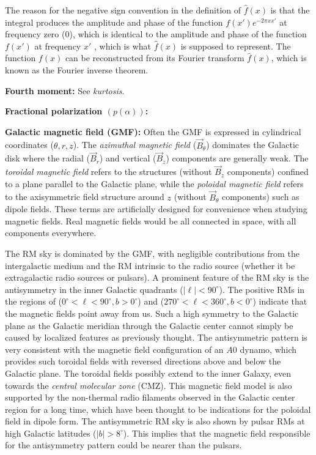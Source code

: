 \documentclass[a4paper,10pt]{article}
\begin{document}
{\noindent}The reason for the negative sign convention in the definition of $\hat{f}(x)$ is that the integral produces the amplitude and phase of the function $f(x')e^{-2\pi xx'}$ at frequency zero ($0$), which is identical to the amplitude and phase of the function $f(x')$ at frequency $x'$ , which is what $\hat{f}(x)$ is supposed to represent. The function $f(x)$ can be reconstructed from its Fourier transform $\hat{f}(x)$, which is known as the Fourier inverse theorem.

{\noindent}\textbf{Fourth moment:} See \textit{kurtosis}.

{\noindent}\textbf{Fractional polarization $(p(\alpha))$:}

{\noindent}\textbf{Galactic magnetic field (GMF):} Often the GMF is expressed in cylindrical coordinates ($\theta, r, z$). The \textit{azimuthal magnetic field} ($\vec{B}_\theta$) dominates the Galactic disk where the radial ($\vec{B}_r$) and vertical ($\vec{B}_z$) components are generally weak. The \textit{toroidal magnetic field} refers to the structures (without $\vec{B}_z$ components) confined to a plane parallel to the Galactic plane, while the \textit{poloidal magnetic field} refers to the axisymmetric field structure around $z$ (without $\vec{B}_\theta$ components) such as dipole fields. These terms are artificially designed for convenience when studying magnetic fields. Real magnetic fields would be all connected in space, with all components everywhere.

{\noindent}The RM sky is dominated by the GMF, with negligible contributions from the intergalactic medium and the RM intrinsic to the radio source (whether it be extragalactic radio sources or pulsars). A prominent feature of the RM sky is the antisymmetry in the inner Galactic quadrants ($|\ell|<90^\circ$). The positive RMs in the regions of ($0^\circ<\ell<90^\circ, b>0^\circ$) and ($270^\circ<\ell<360^\circ, b<0^\circ$) indicate that the magnetic fields point away from us. Such a high symmetry to the Galactic plane as the Galactic meridian through the Galactic center cannot simply be caused by localized features as previously thought. The antisymmetric pattern is very consistent with the magnetic field configuration of an $A0$ dynamo, which provides such toroidal fields with reversed directions above and below the Galactic plane. The toroidal fields possibly extend to the inner Galaxy, even towards the \textit{central molecular zone} (CMZ). This magnetic field model is also supported by the non-thermal radio filaments observed in the Galactic center region for a long time, which have been thought to be indications for the poloidal field in dipole form. The antisymmetric RM sky is also shown by pulsar RMs at high Galactic latitudes ($|b|>8^\circ$). This implies that the magnetic field responsible for the antisymmetry pattern could be nearer than the pulsars. 
\end{document}
